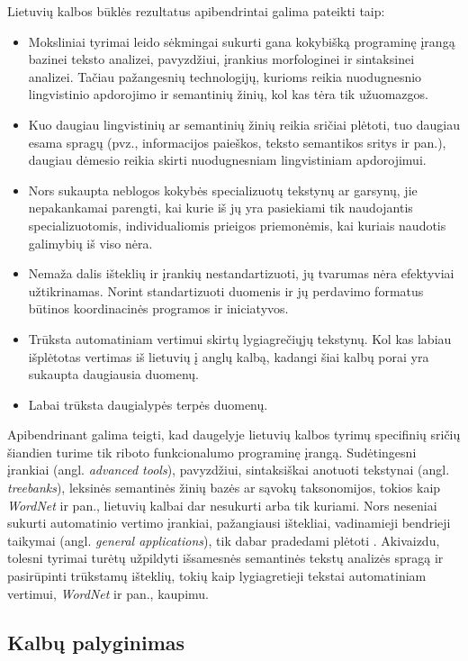 \documentclass[]{../metanetpaper}
\begin{document}
\begin{multicols}{2}
Lietuvių kalbos būklės rezultatus apibendrintai galima pateikti taip:

\begin{itemize}
\item Moksliniai tyrimai leido sėkmingai sukurti gana kokybišką programinę įrangą bazinei teksto analizei, pavyzdžiui, įrankius morfologinei ir sintaksinei analizei. Tačiau pažangesnių technologijų, kurioms reikia nuodugnesnio lingvistinio apdorojimo ir semantinių žinių, kol kas tėra tik užuomazgos.
\item Kuo daugiau lingvistinių ar semantinių žinių reikia sričiai plėtoti, tuo daugiau esama spragų (pvz., informacijos paieškos, teksto semantikos sritys ir pan.), daugiau dėmesio reikia skirti nuodugnesniam lingvistiniam apdorojimui.
\item Nors sukaupta neblogos kokybės specializuotų tekstynų ar garsynų, jie nepakankamai parengti, kai kurie iš jų yra pasiekiami tik naudojantis specializuotomis, individualiomis prieigos priemonėmis, kai kuriais naudotis galimybių iš viso nėra. 
\item  Nemaža dalis išteklių ir įrankių nestandartizuoti, jų tvarumas nėra efektyviai užtikrinamas. Norint standartizuoti duomenis ir jų perdavimo formatus būtinos koordinacinės programos ir iniciatyvos.
\item Trūksta automatiniam vertimui skirtų lygiagrečiųjų tekstynų. Kol kas labiau išplėtotas vertimas iš lietuvių į anglų kalbą, kadangi šiai kalbų porai yra sukaupta daugiausia duomenų.
\item Labai trūksta daugialypės terpės duomenų.	
\end{itemize}

Apibendrinant galima teigti, kad daugelyje lietuvių kalbos tyrimų specifinių sričių šiandien turime tik riboto funkcionalumo programinę įrangą. Sudėtingesni įrankiai (angl. \textit{advanced tools}), pavyzdžiui, sintaksiškai anotuoti tekstynai (angl. \textit{treebanks}), leksinės semantinės žinių bazės ar sąvokų taksonomijos, tokios kaip \textit{WordNet} ir pan., lietuvių kalbai dar nesukurti arba tik kuriami. Nors neseniai sukurti automatinio vertimo įrankiai, pažangiausi ištekliai, vadinamieji bendrieji taikymai (angl. \textit{general applications}), tik dabar pradedami plėtoti \cite{td1}. Akivaizdu, tolesni tyrimai turėtų užpildyti išsamesnės semantinės tekstų analizės spragą ir pasirūpinti trūkstamų išteklių, tokių kaip lygiagretieji tekstai automatiniam vertimui, \textit{WordNet} ir pan., kaupimu.

\subsection{Kalbų palyginimas}


\end{multicols}
\end{document}
